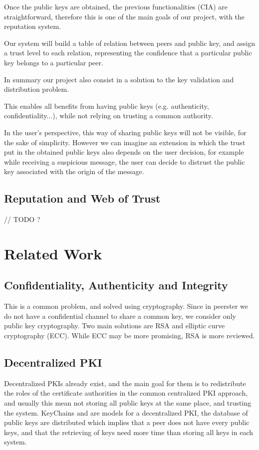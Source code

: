 \documentclass[]{article}
\begin{document}
Once the public keys are obtained, the previous functionalities (CIA) are straightforward, therefore this is one of the main goals of our project, with the reputation system.

Our system will build a table of relation between peers and public key, and assign a trust level to each relation, representing the confidence that a particular public key belongs to a particular peer.

In summary our project also consist in a solution to the key validation and distribution problem. 

This enables all benefits from having public keys (e.g. authenticity, confidentiality...), while not relying on trusting a common authority. \newline

In the user's perspective, this way of sharing public keys will not be visible, for the sake of simplicity. However we can imagine an extension in which the trust put in the obtained public keys also depends on the user decision, for example while receiving a suspicious message, the user can decide to distrust the public key associated with the origin of the message.

\subsection{Reputation and Web of Trust}
// TODO ?

\section{Related Work}

\subsection{Confidentiality, Authenticity and Integrity}
This is a common problem, and solved using cryptography. Since in peerster we do not have a confidential channel to share a common key, we consider only public key cryptography. Two main solutions are RSA \cite{RFC8017} and elliptic curve cryptography (ECC). While ECC may be more promising, RSA is more reviewed.

\subsection{Decentralized PKI}
Decentralized PKIs already exist, and the main goal for them is to redistribute the roles of the certificate authorities in the common centralized PKI approach, and usually this mean not storing all public keys at the same place, and trusting the system. KeyChains \cite{morselli2006keychains} and \cite{aberer2005decentralised} are models for a decentralized PKI, the database of public keys are distributed which implies that a peer does not have every public keys, and that the retrieving of keys need more time than storing all keys in each system.
\end{document}
